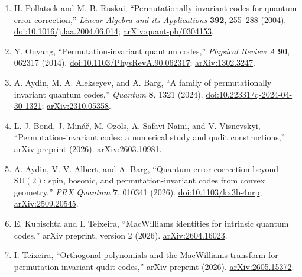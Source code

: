 \begin{enumerate}[label={},leftmargin=4.8em,labelsep=0.5em]
  \footnotesize
  \item[\textup{[PR04]}]\label{ref:2fba-pollatsek-ruskai}
  H. Pollatsek and M. B. Ruskai, ``Permutationally invariant codes for quantum
  error correction,'' \emph{Linear Algebra and its Applications} \textbf{392},
  255--288 (2004).
  \href{https://doi.org/10.1016/j.laa.2004.06.014}{doi:10.1016/j.laa.2004.06.014};
  \href{https://arxiv.org/abs/quant-ph/0304153}{arXiv:quant-ph/0304153}.

  \item[\textup{[Ouy14]}]\label{ref:2fba-ouyang}
  Y. Ouyang, ``Permutation-invariant quantum codes,'' \emph{Physical Review A}
  \textbf{90}, 062317 (2014).
  \href{https://doi.org/10.1103/PhysRevA.90.062317}{doi:10.1103/PhysRevA.90.062317};
  \href{https://arxiv.org/abs/1302.3247}{arXiv:1302.3247}.

  \item[\textup{[AAB24]}]\label{ref:2fba-aab}
  A. Aydin, M. A. Alekseyev, and A. Barg, ``A family of permutationally
  invariant quantum codes,'' \emph{Quantum} \textbf{8}, 1321 (2024).
  \href{https://doi.org/10.22331/q-2024-04-30-1321}{doi:10.22331/q-2024-04-30-1321};
  \href{https://arxiv.org/abs/2310.05358}{arXiv:2310.05358}.

  \item[\textup{[BMO+26]}]\label{ref:2fba-bond-et-al}
  L. J. Bond, J. Min\'a\v{r}, M. Ozols, A. Safavi-Naini, and V. Visnevskyi,
  ``Permutation-invariant codes: a numerical study and qudit constructions,''
  arXiv preprint (2026).
  \href{https://arxiv.org/abs/2603.10981}{arXiv:2603.10981}.

  \item[\textup{[AAB26]}]\label{ref:2fba-aab-convex}
  A. Aydin, V. V. Albert, and A. Barg, ``Quantum error correction beyond
  $\mathrm{SU}(2)$: spin, bosonic, and permutation-invariant codes from convex
  geometry,'' \emph{PRX Quantum} \textbf{7}, 010341 (2026).
  \href{https://doi.org/10.1103/kx3b-4nrp}{doi:10.1103/kx3b-4nrp};
  \href{https://arxiv.org/abs/2509.20545}{arXiv:2509.20545}.

  \item[\textup{[KT26]}]\label{ref:2fba-kubischta-teixeira}
  E. Kubischta and I. Teixeira, ``MacWilliams identities for intrinsic quantum
  codes,'' arXiv preprint, version 2 (2026).
  \href{https://arxiv.org/abs/2604.16023}{arXiv:2604.16023}.

  \item[\textup{[Tei26]}]\label{ref:2fba-teixeira}
  I. Teixeira, ``Orthogonal polynomials and the MacWilliams transform for
  permutation-invariant qudit codes,'' arXiv preprint (2026).
  \href{https://arxiv.org/abs/2605.15372}{arXiv:2605.15372}.
\end{enumerate}

